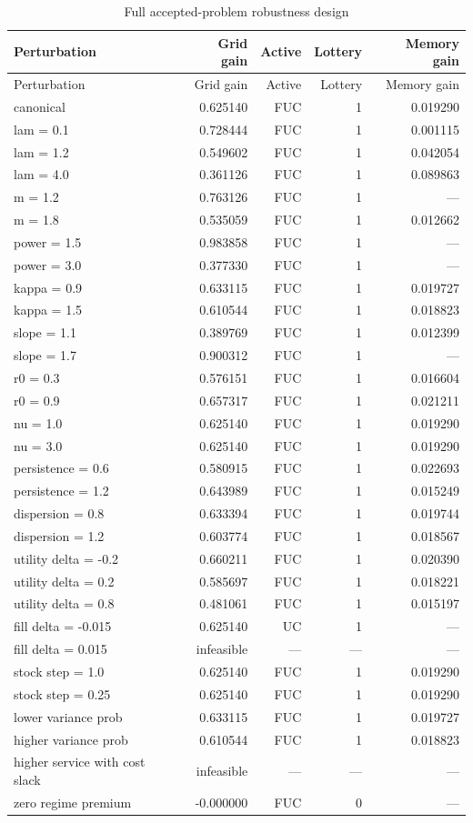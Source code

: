 \begin{longtable}{p{}rrrr}
\caption{Full accepted-problem robustness design}\label{tab:robust-all}\\
\toprule Perturbation & Grid gain & Active & Lottery & Memory gain\\\midrule\endfirsthead
\toprule Perturbation & Grid gain & Active & Lottery & Memory gain\\\midrule\endhead
canonical & 0.625140 & FUC & 1 & 0.019290\\
lam = 0.1 & 0.728444 & FUC & 1 & 0.001115\\
lam = 1.2 & 0.549602 & FUC & 1 & 0.042054\\
lam = 4.0 & 0.361126 & FUC & 1 & 0.089863\\
m = 1.2 & 0.763126 & FUC & 1 & ---\\
m = 1.8 & 0.535059 & FUC & 1 & 0.012662\\
power = 1.5 & 0.983858 & FUC & 1 & ---\\
power = 3.0 & 0.377330 & FUC & 1 & ---\\
kappa = 0.9 & 0.633115 & FUC & 1 & 0.019727\\
kappa = 1.5 & 0.610544 & FUC & 1 & 0.018823\\
slope = 1.1 & 0.389769 & FUC & 1 & 0.012399\\
slope = 1.7 & 0.900312 & FUC & 1 & ---\\
r0 = 0.3 & 0.576151 & FUC & 1 & 0.016604\\
r0 = 0.9 & 0.657317 & FUC & 1 & 0.021211\\
nu = 1.0 & 0.625140 & FUC & 1 & 0.019290\\
nu = 3.0 & 0.625140 & FUC & 1 & 0.019290\\
persistence = 0.6 & 0.580915 & FUC & 1 & 0.022693\\
persistence = 1.2 & 0.643989 & FUC & 1 & 0.015249\\
dispersion = 0.8 & 0.633394 & FUC & 1 & 0.019744\\
dispersion = 1.2 & 0.603774 & FUC & 1 & 0.018567\\
utility delta = -0.2 & 0.660211 & FUC & 1 & 0.020390\\
utility delta = 0.2 & 0.585697 & FUC & 1 & 0.018221\\
utility delta = 0.8 & 0.481061 & FUC & 1 & 0.015197\\
fill delta = -0.015 & 0.625140 & UC & 1 & ---\\
fill delta = 0.015 & infeasible & --- & --- & ---\\
stock step = 1.0 & 0.625140 & FUC & 1 & 0.019290\\
stock step = 0.25 & 0.625140 & FUC & 1 & 0.019290\\
lower variance prob & 0.633115 & FUC & 1 & 0.019727\\
higher variance prob & 0.610544 & FUC & 1 & 0.018823\\
higher service with cost slack & infeasible & --- & --- & ---\\
zero regime premium & -0.000000 & FUC & 0 & ---\\
\bottomrule\end{longtable}
